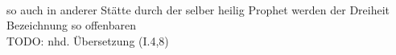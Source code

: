 \begin{exe}
\ex \label{ex:I2524} \gll {}                \object{: } \\
{so} {auch} {in} {anderer} {Stätte} {durch} {der} {selber} {heilig} {Prophet} {werden} {der} {Dreiheit} {Bezeichnung} {so} {offenbaren} {}\\
\glt TODO: nhd. Übersetzung (I.4,8)
\end{exe}
